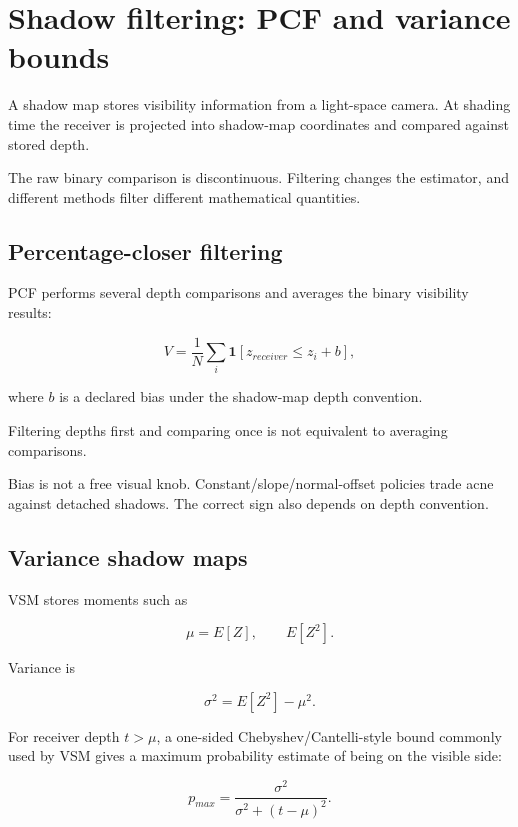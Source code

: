 \hypertarget{appendix-7cac8a689849}{}\label{referencestart:appendix-7cac8a689849}
\section{Shadow filtering: PCF and variance bounds}\label{appendix-7cac8a689849-shadow-filtering-pcf-and-variance-bounds}

A shadow map stores visibility information from a light-space camera. At shading time the receiver is projected into shadow-map coordinates and compared against stored depth.

The raw binary comparison is discontinuous. Filtering changes the estimator, and different methods filter different mathematical quantities.

\subsection{Percentage-closer filtering}\label{appendix-7cac8a689849-percentage-closer-filtering}

PCF performs several depth comparisons and averages the binary visibility results:

\[
V=
\frac{1}{N}
\sum_i
\mathbf 1[z_{receiver}\le z_i+b],
\]

where \(b\) is a declared bias under the shadow-map depth convention.

Filtering depths first and comparing once is not equivalent to averaging comparisons.

Bias is not a free visual knob. Constant/slope/normal-offset policies trade acne against detached shadows. The correct sign also depends on depth convention.

\subsection{Variance shadow maps}\label{appendix-7cac8a689849-variance-shadow-maps}

VSM stores moments such as

\[
\mu=E[Z],
\qquad
E[Z^2].
\]

Variance is

\[
\sigma^2=E[Z^2]-\mu^2.
\]

For receiver depth \(t>\mu\), a one-sided Chebyshev/Cantelli-style bound commonly used by VSM gives a maximum probability estimate of being on the visible side:

\[
p_{max}
=
\frac{\sigma^2}
{\sigma^2+(t-\mu)^2}.
\]

